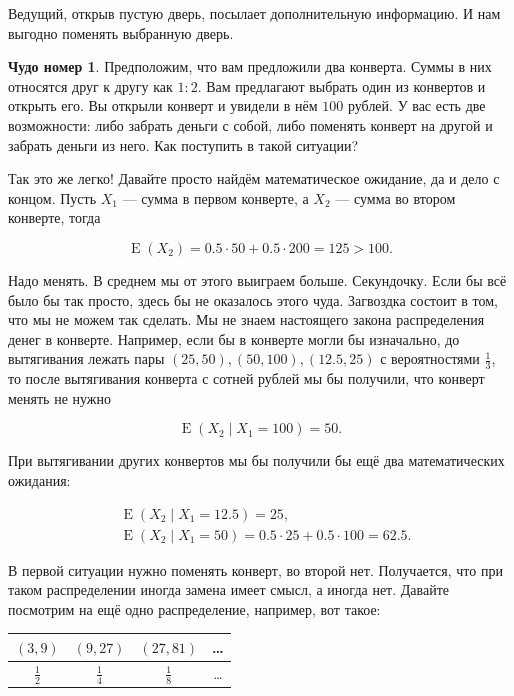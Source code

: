 \documentclass[12pt, a4paper, oneside]{extreport}
\DeclareMathOperator{\E}{\mathop{E}}
\theoremstyle{plain}              %
\theoremstyle{definition}         %
\newtheorem{chudo}{Чудо номер}   %
\begin{document}
Ведущий, открыв пустую дверь, посылает дополнительную информацию. И нам выгодно поменять выбранную дверь. 

\begin{chudo}
Предположим, что вам предложили два конверта. Суммы в них относятся друг к другу как $1:2$. Вам предлагают выбрать один из конвертов и открыть его. Вы открыли конверт и увидели в нём $100$ рублей. У вас есть две возможности: либо забрать деньги с собой, либо поменять конверт на другой и забрать деньги из него. Как поступить в такой ситуации?
\end{chudo}

Так это же легко! Давайте просто найдём математическое ожидание, да и дело с концом. Пусть $X_1$ --- сумма в первом конверте, а $X_2$ --- сумма во втором конверте, тогда

\[ \E(X_2) = 0.5 \cdot 50 + 0.5 \cdot 200  = 125 > 100. \]

Надо менять. В среднем мы от этого выиграем больше. Секундочку. Если бы всё было бы так просто, здесь бы не оказалось этого чуда. Загвоздка состоит в том, что мы не можем так сделать. Мы не знаем настоящего закона распределения денег в конверте. Например, если бы в конверте могли бы изначально, до вытягивания лежать пары $(25,50), (50,100), (12.5,25)$ с вероятностями $\frac{1}{3}$, то после вытягивания конверта с сотней рублей мы бы получили, что конверт менять не нужно

\[ \E(X_2 \mid X_1 = 100) = 50. \]

 При вытягивании других конвертов мы бы получили бы ещё два математических ожидания:

\begin{equation*}
\begin{aligned}
& \E(X_2 \mid X_1 = 12.5) = 25, \\ 
& \E(X_2 \mid X_1 = 50) = 0.5 \cdot 25 + 0.5 \cdot 100 = 62.5.
\end{aligned}
\end{equation*}

В первой ситуации нужно поменять конверт, во второй нет. Получается, что при таком распределении иногда замена имеет смысл, а иногда нет.  Давайте посмотрим на ещё одно распределение, например, вот такое: 

\begin{center}
\begin{tabular}{c|c|c|c}
$(3,9)$ & $(9,27)$ & $(27,81)$ & \ldots  \\ \hline
$\frac{1}{2}$ & $\frac{1}{4}$ & $\frac{1}{8}$ & \ldots
\end{tabular}
\end{center}
\end{document}
